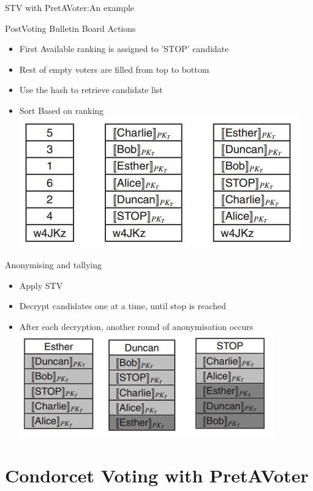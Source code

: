 \documentclass{beamer}
\begin{document}
\begin{frame}[allowframebreaks]{STV with PretAVoter:An example}
\begin{block}{PostVoting Bulletin Board Actions}
\begin{itemize}
\item First Available ranking is assigned to 'STOP' candidate
\item Rest of empty voters are filled from top to bottom
\item Use the hash to retrieve candidate list
\item Sort Based on ranking
\includegraphics[scale=0.5]{stv4.jpg}
\end{itemize}
\end{block}

\begin{block}{Anonymising and tallying}
\begin{itemize}
\item Apply STV
\item Decrypt candidates one at a time, until stop is reached
\item After each decryption, another round of anonymisation occurs
\includegraphics[scale=0.5]{stv5.jpg}
\end{itemize}
\end{block}

\end{frame}

\section*{Condorcet Voting with PretAVoter}
\end{document}
